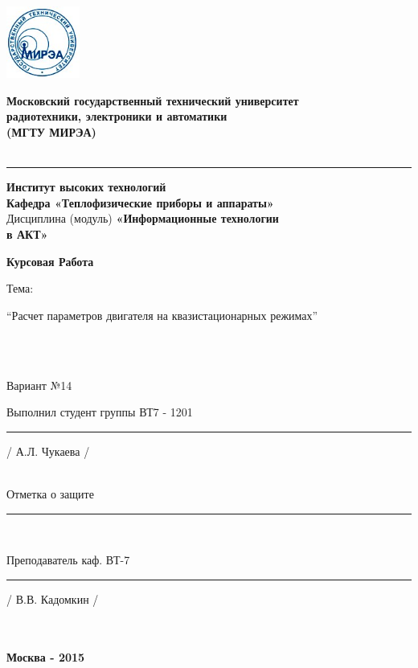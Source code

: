 \includegraphics[width=2.4cm]{mirea} 
\begin{center}
\begin{LARGE}
\textbf{Московский государственный технический университет}\\
\textbf{радиотехники, электроники и автоматики}\\
\textbf{(МГТУ МИРЭА)} \\
~\\
\hrule \vspace {10pt}
\textbf{Институт высоких технологий} \\

\textbf{Кафедра «Теплофизические приборы и аппараты»} \\
Дисциплина (модуль) \textbf{«Информационные технологии\\
в АКТ»} \\
\end{LARGE}
\begin{Huge}
\textbf{Курсовая Работа}\\
\end{Huge}
\begin{large}
Тема: 
\end{large}
\begin{normalsize}
“Расчет параметров двигателя на квазистационарных режимах” \\
\end{normalsize}
~\\
~\\
\begin{large}
Вариант №14\\

\end{large}
\end{center}
\begin{flushright}
Выполнил студент группы ВТ7 - 1201\\
\rule{4cm}{0.01pt} / А.Л. Чукаева / \\
~\\
\end{flushright}
\begin{flushleft}
Отметка о защите \rule{5cm}{0.01pt} \\
\end{flushleft}
\begin{flushright}

Преподаватель каф. ВТ-7 \\
\rule{4cm}{0.01pt} / В.В. Кадомкин / \\
~\\
~\\
\end{flushright}
\begin{center}
\textbf{Москва - 2015}
\end{center}